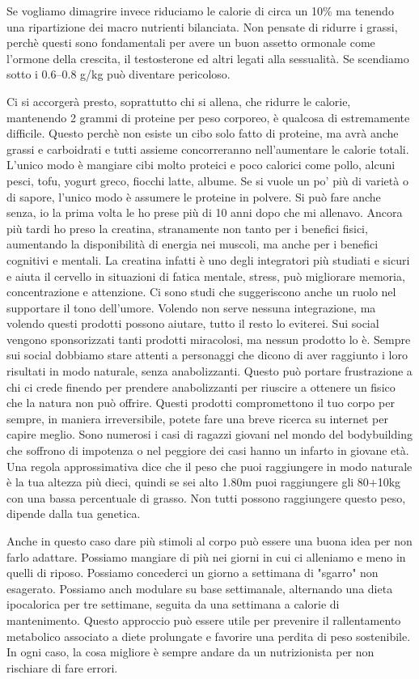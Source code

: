 \documentclass[12pt]{book} %
\begin{document}
Se vogliamo dimagrire invece riduciamo le calorie di circa un 10\% ma tenendo una ripartizione dei macro nutrienti bilanciata. Non pensate di ridurre i grassi, perchè questi sono fondamentali per avere un buon assetto ormonale come l'ormone della crescita, il testosterone ed altri legati alla sessualità. Se scendiamo sotto i 0.6–0.8 g/kg può diventare pericoloso.

Ci si accorgerà presto, soprattutto chi si allena, che ridurre le calorie, mantenendo 2 grammi di proteine per peso corporeo, è qualcosa di estremamente difficile. Questo perchè non esiste un cibo solo fatto di proteine, ma avrà anche grassi e carboidrati e tutti assieme concorreranno nell'aumentare le calorie totali. L'unico modo è mangiare cibi molto proteici e poco calorici come pollo, alcuni pesci, tofu, yogurt greco, fiocchi latte, albume. Se si vuole un po' più di varietà o di sapore, l'unico modo è assumere le proteine in polvere. Si può fare anche senza, io la prima volta le ho prese più di 10 anni dopo che mi allenavo. Ancora più tardi ho preso la creatina, stranamente non tanto per i benefici fisici, aumentando la disponibilità di energia nei muscoli, ma anche per i benefici cognitivi e mentali. La creatina infatti è uno degli integratori più studiati e sicuri e aiuta il cervello in situazioni di fatica mentale, stress, può migliorare memoria, concentrazione e attenzione. Ci sono studi che suggeriscono anche un ruolo nel supportare il tono dell’umore.
Volendo non serve nessuna integrazione, ma volendo questi prodotti possono aiutare, tutto il resto lo eviterei. Sui social vengono sponsorizzati tanti prodotti miracolosi, ma nessun prodotto lo è. Sempre sui social dobbiamo stare attenti a personaggi che dicono di aver raggiunto i loro risultati in modo naturale, senza anabolizzanti. Questo può portare frustrazione a chi ci crede finendo per prendere anabolizzanti per riuscire a ottenere un fisico che la natura non può offrire. Questi prodotti compromettono il tuo corpo per sempre, in maniera irreversibile, potete fare una breve ricerca su internet per capire meglio. Sono numerosi i casi di ragazzi giovani nel mondo del bodybuilding che soffrono di impotenza o nel peggiore dei casi hanno un infarto in giovane età. Una regola approssimativa dice che il peso che puoi raggiungere in modo naturale è la tua altezza più dieci, quindi se sei alto 1.80m puoi raggiungere gli 80+10kg con una bassa percentuale di grasso. Non tutti possono raggiungere questo peso, dipende dalla tua genetica.

Anche in questo caso dare più stimoli al corpo può essere una buona idea per non farlo adattare. Possiamo mangiare di più nei giorni in cui ci alleniamo e meno in quelli di riposo. Possiamo concederci un giorno a settimana di "sgarro" non esagerato. Possiamo anch modulare su base settimanale, alternando una dieta ipocalorica per tre settimane, seguita da una settimana a calorie di mantenimento. Questo approccio può essere utile per prevenire il rallentamento metabolico associato a diete prolungate e favorire una perdita di peso sostenibile. In ogni caso, la cosa migliore è sempre andare da un nutrizionista per non rischiare di fare errori.
\end{document}
